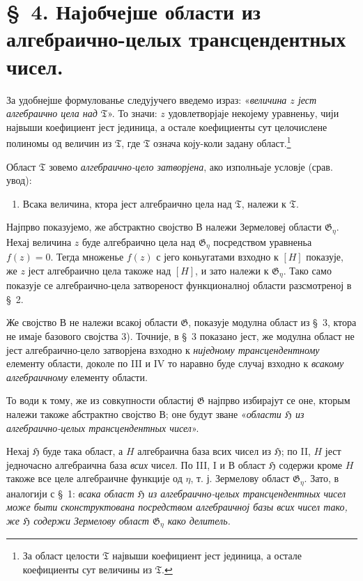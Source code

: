 ﻿\documentclass[11pt]{article}
\begin{document}
\section*{\S\ 4. Најобчејше области из алгебраично-целых трансцендентных чисел.}

За удобнејше формулованье следујучего введемо израз:
«{\itshape величина $z$ јест алгебраично цела над $\mathfrak T$}». То значи:
$z$ удовлетворјаје некојему уравненьу, чији највыши коефициент јест јединица, а
остале коефициенты сут целочислене полиномы од величин из $\mathfrak T$, где
$\mathfrak T$ означа коју-коли задану област.\footnote{За област целости
$\mathfrak T$ највыши коефициент јест јединица, а остале коефициенты сут
величины из $\mathfrak T$.}

Област $\mathfrak T$ зовемо {\itshape алгебраично-цело затворјена}, ако
изполньаје условје (срав. увод):
\begin{enumerate}
\item[В.] Всака величина, ктора јест алгебраично цела над $\mathfrak T$, належи к
$\mathfrak T$.
\end{enumerate}

Најпрво показујемо, же абстрактно својство В належи Зермеловеј области
$\mathfrak G_\eta$. Нехај величина $z$ буде алгебраично цела над
$\mathfrak G_\eta$ посредством уравненьа $f(z)=0$. Тегда множенье $f(z)$ с јего
коньугатами взходно к $[H]$ показује, же $z$ јест алгебраично цела такоже над
$[H]$, и зато належи к $\mathfrak G_\eta$. Тако само показује се
алгебраично-цела затвореност функционалној области разсмотреној в \S\ 2.

Же својство В не належи всакој области $\mathfrak G$, показује модулна област
из \S\ 3, ктора не имаје базового својства 3). Точније, в \S\ 3 показано јест,
же модулна област не јест алгебраично-цело затворјена взходно к {\itshape
ниједному трансцендентному} елементу области, доколе по III и IV то наравно
буде случај взходно к {\itshape всакому алгебраичному} елементу области.

То води к тому, же из совкупности областиј $\mathfrak G$ најпрво избирајут се
оне, кторым належи такоже абстрактно својство В; оне будут зване
«{\itshape области $\mathfrak H$ из алгебраично-целых трансцендентных чисел}».

Нехај $\mathfrak H$ буде така област, а $H$ алгебраична база всих чисел из
$\mathfrak H$; по II, $H$ јест једночасно алгебраична база {\itshape всих}
чисел. По III, I и В област $\mathfrak H$ содержи кроме $H$ такоже все целе
алгебраичне функције од $\eta$, т. ј. Зермелову област $\mathfrak G_\eta$.
Зато, в аналогији с \S\ 1: {\itshape всака област $\mathfrak H$ из
алгебраично-целых трансцендентных чисел може быти сконструктована посредством
алгебраичној базы всих чисел тако, же $\mathfrak H$ содержи Зермелову област
$\mathfrak G_\eta$ како делитель.}
\end{document}
